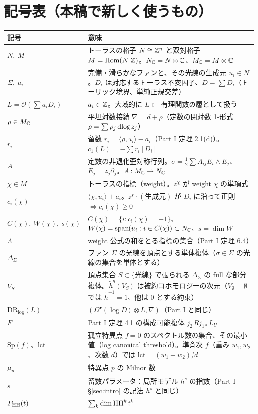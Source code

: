 \section{記号表（本稿で新しく使うもの）}\label{sec:notation}
\begin{longtable}{>{\raggedright\arraybackslash}p{3.6cm}>{\raggedright\arraybackslash}p{11.4cm}}
\toprule 記号 & 意味\\ \midrule\endhead
$N,\ M$ & トーラスの格子 $N\cong\mathbb Z^n$ と双対格子 $M=\mathrm{Hom}(N,\mathbb Z)$。$N_\mathbb C=N\otimes\mathbb C$、$M_\mathbb C=M\otimes\mathbb C$\\
$\Sigma,\ u_i$ & 完備・滑らかなファンと、その光線の生成元 $u_i\in N$。$D_i$ は対応するトーラス不変因子、$D=\sum D_i$（トーリック境界、単純正規交差）\\
$L=\mathcal O(\sum a_iD_i)$ & $a_i\in\mathbb Z$。大域的に $L\subset$ 有理関数の層として扱う\\
$\rho\in M_\mathbb C$ & 平坦対数接続 $\nabla=d+\rho$（定数の閉対数 1-形式 $\rho=\sum\rho_j\,\mathrm{dlog}\, z_j$）\\
$r_i$ & 留数 $r_i=\langle\rho,u_i\rangle-a_i$（Part I 定理 2.1(d)）。$c_1(L)=-\sum r_i[D_i]$\\
$A$ & 定数の非退化歪対称行列。$\sigma=\tfrac12\sum A_{ij}E_i\wedge E_j$、$E_j=z_j\partial_j$。$A:M_\mathbb C\to N_\mathbb C$\\
$\chi\in M$ & トーラスの指標（weight）。$z^\chi$ が weight $\chi$ の単項式\\
$c_i(\chi)$ & $\langle\chi,u_i\rangle+a_i$。$z^\chi\cdot(\text{生成元})$ が $D_i$ に沿って正則 $\Leftrightarrow c_i(\chi)\ge0$\\
$C(\chi),\ W(\chi),\ s(\chi)$ & $C(\chi)=\{i:c_i(\chi)=-1\}$、$W(\chi)=\mathrm{span}(u_i:i\in C(\chi))\subset N_\mathbb C$、$s=\dim W$\\
$\Lambda$ & weight 公式の和をとる指標の集合（Part I 定理 6.4）\\
$\Delta_\Sigma$ & ファン $\Sigma$ の光線を頂点とする単体複体（$\sigma\in\Sigma$ の光線の集合を単体とする）\\
$V_S$ & 頂点集合 $S\subset\{\text{光線}\}$ で張られる $\Delta_\Sigma$ の full な部分複体。$\tilde h^q(V_S)$ は被約コホモロジーの次元（$V_\emptyset=\emptyset$ では $\tilde h^{-1}=1$、他は 0 とする約束）\\
$\mathrm{DR}_{\log}(L)$ & $(\Omega^\bullet(\log D)\otimes L,\nabla)$（Part I と同じ）\\
$F$ & Part I 定理 4.1 の構成可能複体 $j_{2!}Rj_{1*}L_U$\\
$\mathrm{Sp}(f)$、$\mathrm{lct}$ & 孤立特異点 $f=0$ のスペクトル数の集合、その最小値（log canonical threshold）。準斉次 $f$（重み $w_1,w_2$、次数 $d$）では $\mathrm{lct}=(w_1+w_2)/d$\\
$\mu_p$ & 特異点 $p$ の Milnor 数\\
$s$ & 留数パラメータ：局所モデル $h^s$ の指数（Part I \S\ref{sec:intro} の記法 $h^s$ と同じ）\\
$P_{\mathrm{HH}}(t)$ & $\sum_k\dim\mathrm{HH}^k\,t^k$\\
\bottomrule
\end{longtable}
